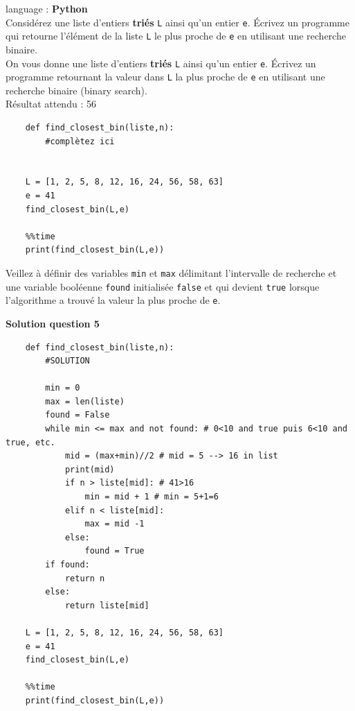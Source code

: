 \begin{Exercice}[15 minutes] language : \textbf{Python}\\

Considérez une liste d’entiers \textbf{triés} \lstinline{L} ainsi qu’un entier \lstinline{e}. Écrivez un programme qui retourne l'élément de la liste \lstinline{L} le plus proche de \lstinline{e} en utilisant une recherche binaire.\\

On vous donne une liste d’entiers \textbf{triés} \lstinline{L} ainsi qu’un entier \lstinline{e}. Écrivez un programme retournant la valeur dans \lstinline{L} la plus proche de \lstinline{e} en utilisant une recherche binaire (binary search).\\

Résultat attendu : 56\\

    \begin{verbatim}
    def find_closest_bin(liste,n):
        #complètez ici
        
        
    L = [1, 2, 5, 8, 12, 16, 24, 56, 58, 63]  
    e = 41
    find_closest_bin(L,e)
    
    %%time
    print(find_closest_bin(L,e))
    \end{verbatim}

\begin{conseil}
    Veillez à définir des variables \lstinline{min} et \lstinline{max} délimitant l'intervalle de recherche et une variable booléenne \lstinline{found} initialisée \lstinline{false} et qui devient \lstinline{true} lorsque l'algorithme a trouvé la valeur la plus proche de \lstinline{e}. 
    
\end{conseil}

\textbf{Solution question 5}
    \begin{verbatim}
    def find_closest_bin(liste,n):
        #SOLUTION
        
        min = 0
        max = len(liste)
        found = False
        while min <= max and not found: # 0<10 and true puis 6<10 and true, etc.
            mid = (max+min)//2 # mid = 5 --> 16 in list
            print(mid)
            if n > liste[mid]: # 41>16
                min = mid + 1 # min = 5+1=6
            elif n < liste[mid]:
                max = mid -1
            else:
                found = True
        if found:
            return n
        else:
            return liste[mid]
        
    L = [1, 2, 5, 8, 12, 16, 24, 56, 58, 63]  
    e = 41
    find_closest_bin(L,e)
    
    %%time
    print(find_closest_bin(L,e))
    \end{verbatim}

\end{Exercice}

